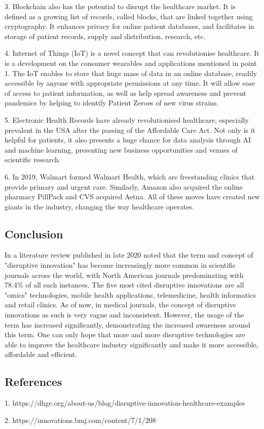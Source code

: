 \documentclass[11pt]{article}
\begin{document}
3. Blockchain also has the potential to disrupt the healthcare market. It is defined as a growing list of records, called blocks, that are linked together using cryptography. It enhances privacy for online patient databases, and facilitates in storage of patient records, supply and distribution, research, etc.

4. Internet of Things (IoT) is a novel concept that can revolutionise healthcare. It is a development on the consumer wearables and applications mentioned in point 1. The IoT enables to store that huge mass of data in an online database, readily accessible by anyone with appropriate permissions at any time. It will allow ease of access to patient information, as well as help spread awareness and prevent pandemics by helping to identify Patient Zeroes of new virus strains.

5. Electronic Health Records have already revolutionised healthcare, especially prevalent in the USA after the passing of the Affordable Care Act. Not only is it helpful for patients, it also presents a huge chance for data analysis through AI and machine learning, presenting new business opportunities and venues of scientific research.

6. In 2019, Walmart formed Walmart Health, which are freestanding clinics that provide primary and urgent care. Similarly, Amazon also acquired the online pharmacy PillPack and CVS acquired Aetna.  All of these moves have created new giants in the industry, changing the way healthcare operates. 

\subsection*{Conclusion}

In a literature review published in late 2020 noted that the term and concept of "disruptive innovation" has become increasingly more common in scientific journals across the world, with North American journals predominating with 78.4\% of all such instances. The five most cited disruptive innovations are all "omics" technologies, mobile health applications, telemedicine, health informatics and retail clinics. As of now, in medical journals, the concept of disruptive innovations as such is very vague and inconsistent. However, the usage of the term has increased significantly, demonstrating the increased awareness around this term. One can only hope that more and more disruptive technologies are able to improve the healthcare industry significantly and make it more accessible, affordable and efficient.


\subsection*{References}

1. https://dhge.org/about-us/blog/disruptive-innovation-healthcare-examples

2. https://innovations.bmj.com/content/7/1/208
\end{document}
